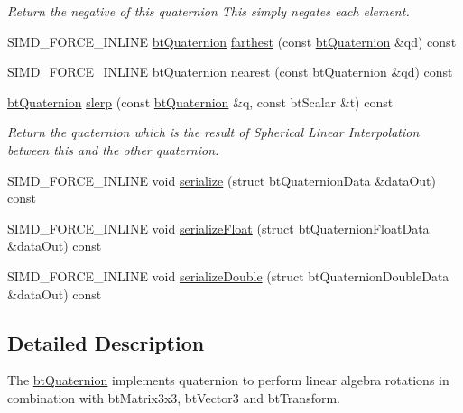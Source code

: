 \begin{CompactItemize}
\begin{CompactList}\small\item\em Return the negative of this quaternion This simply negates each element. \item\end{CompactList}\item 
SIMD\_\-FORCE\_\-INLINE \hyperlink{classbt_quaternion}{btQuaternion} \hyperlink{classbt_quaternion_deda27273475435a9e3223abeea73992}{farthest} (const \hyperlink{classbt_quaternion}{btQuaternion} \&qd) const 
\item 
SIMD\_\-FORCE\_\-INLINE \hyperlink{classbt_quaternion}{btQuaternion} \hyperlink{classbt_quaternion_821a38604c6333b95d954867315d8716}{nearest} (const \hyperlink{classbt_quaternion}{btQuaternion} \&qd) const 
\item 
\hyperlink{classbt_quaternion}{btQuaternion} \hyperlink{classbt_quaternion_c95a27feda1c165b2ce359e7415fec6f}{slerp} (const \hyperlink{classbt_quaternion}{btQuaternion} \&q, const btScalar \&t) const 
\begin{CompactList}\small\item\em Return the quaternion which is the result of Spherical Linear Interpolation between this and the other quaternion. \item\end{CompactList}\item 
SIMD\_\-FORCE\_\-INLINE void \hyperlink{classbt_quaternion_8bc3a5908e5863652549ac6cf8830ee5}{serialize} (struct btQuaternionData \&dataOut) const 
\item 
SIMD\_\-FORCE\_\-INLINE void \hyperlink{classbt_quaternion_239a6d8a3dc3904adc6ec07151895a85}{serializeFloat} (struct btQuaternionFloatData \&dataOut) const 
\item 
SIMD\_\-FORCE\_\-INLINE void \hyperlink{classbt_quaternion_23f1203633c7afb3750a9e95fae30f40}{serializeDouble} (struct btQuaternionDoubleData \&dataOut) const 
\end{CompactItemize}


\subsection{Detailed Description}
The \hyperlink{classbt_quaternion}{btQuaternion} implements quaternion to perform linear algebra rotations in combination with btMatrix3x3, btVector3 and btTransform. 

